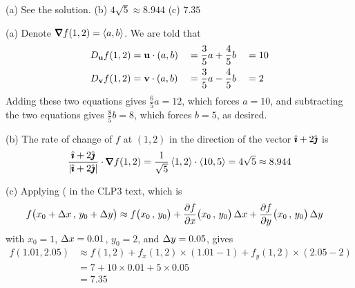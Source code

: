 
\begin{answer}
(a) See the solution.\qquad
(b) $4\sqrt{5}\approx 8.944$\qquad
(c) $7.35$
\end{answer}

\begin{solution}
(a)
Denote $\vnabla f(1,2)= \llt a,b\rgt$. We are told that
\begin{alignat*}{3}
D_{\mathbf{u}} f(1,2)&=\mathbf{u}\cdot(a,b)&&=\frac{3}{5}a+\frac{4}{5}b&&=10 \\
D_{\mathbf{v}} f(1,2)&=\mathbf{v}\cdot(a,b)&&=\frac{3}{5}a-\frac{4}{5}b&&=2
\end{alignat*}
Adding these two equations gives $\frac{6}{5}a=12$, which forces $a=10$,
and subtracting the two equations gives $\frac{8}{5}b=8$, which forces
$b=5$, as desired.

(b) The rate of change of $f$ at $(1,2)$ in the direction
of the vector $\hat{\pmb{\imath}}+2\hat{\pmb{\jmath}}$ is
\begin{align*}
\frac{\hi+2\hj}{|\hi+2\hj|}\cdot \vnabla f(1,2)
=\frac{1}{\sqrt{5}}\llt 1,2\rgt\cdot\llt 10,5\rgt
=4\sqrt{5}\approx 8.944
\end{align*}

(c) Applying ( in the CLP3 text, which is
\begin{align*}
f\big(x_0+\De x\,,\,y_0+\De y\big)
&\approx f\big(x_0\,,\,y_0\big) 
       + \pdiff{f}{x}\big(x_0\,,\,y_0\big)\,\De x
       + \pdiff{f}{y}\big(x_0\,,\,y_0\big)\,\De y
\end{align*}
with $x_0=1$, $\Delta x=0.01$, $y_0=2$, and $\Delta y=0.05$, gives
\begin{align*}
f(1.01,2.05)
&\approx f(1,2)+f_x(1,2)\times(1.01-1)+f_y(1,2)\times(2.05-2) \\
&=7+10\times0.01+5\times0.05 \\
&=7.35
\end{align*}
\end{solution}

